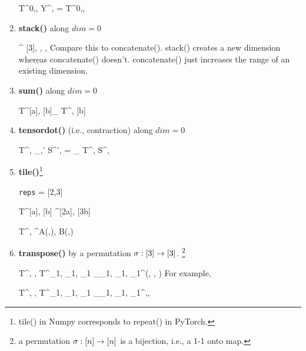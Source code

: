 \begin{enumerate}
\beq
T^{0,\beta, \gamma}
\rarrow
Y^{\beta, \gamma}=
T^{0,\beta, \gamma}
\eeq

\item {\bf stack()} along $dim=0$

\rarrow
{}^{
[3], \alpha, \beta, \gamma}
\eeq
Compare this to concatenate(). stack()
creates a new dimension
whereas concatenate() doesn't. concatenate() just increases the range
of an existing dimension.

\item {\bf sum()} along $dim=0$

\beq
T^{[a], [b]}\rarrow \sum_{\alp} T^{\alp, [b]}
\eeq

\item {\bf tensordot()} (i.e., contraction) along $dim=0$

\rarrow
T^{\alpha, \beta}\delta_{\alpha,\alpha'} S^{\alpha',\beta}
=
\sum_\alp
T^{\alp, \beta}S^{\alp, \beta}
\eeq

\item {\bf  tile()}\footnote{
tile() in Numpy corresponds
to repeat() in PyTorch.}

\beq
{\tt reps} = [2,3]
\eeq

\beq
T^{[a], [b]}\rarrow
{}
^{[2a], [3b]}
\eeq

\beq
T^{\alp, \beta}\rarrow
{}^{A(\alp,\beta), B(\alp,\beta)}
\eeq



\item {\bf transpose()} by a permutation
$\sigma:[3]\rightarrow [3]$. \footnote{ a permutation $\sigma:[n] \rightarrow [n]$ is a bijection, i.e., a 1-1 onto map.}

\beq
T^{\alpha, \beta, \gamma} \rarrow T^{\alpha_1, \beta_1, \gamma_1}
\delta_{\alpha_1, \beta_1, \gamma_1}^{\sigma(\alpha, \beta, \gamma)}
\eeq
For example,

\beq
T^{\alpha, \beta, \gamma} \rarrow T^{\alpha_1, \beta_1, \gamma_1}
\delta_{\alpha_1, \beta_1, \gamma_1}^{\gamma,\beta,\alpha}
\eeq

\end{enumerate}
